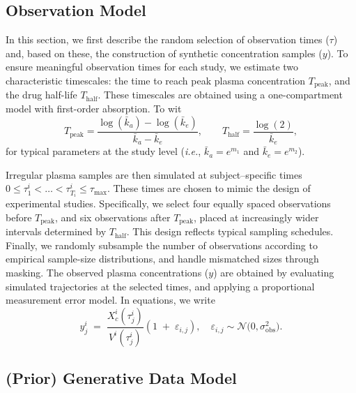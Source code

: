 \subsection{Observation Model}
\label{sec:obs-model}

In this section, we first describe the random selection of observation times ($\tau$) and, based on these, the construction of synthetic concentration samples ($y$).
%
To ensure meaningful observation times for each study, we estimate two characteristic timescales: the time to reach peak plasma concentration $T_\text{peak}$, and the drug half-life $T_\text{half}$. 
%
These timescales are obtained using a one-compartment model with first-order absorption. To wit
%
\begin{equation*}
T_\text{peak} = \frac{\log(\bar k_a) - \log(\bar k_e)}{\bar k_a - \bar k_e},\qquad
T_\text{half} = \frac{\log(2)}{\bar k_e},
\end{equation*}
for typical parameters at the study level (\textit{i.e.}, $\bar k_a = e^{m_1}$ and $\bar k_e = e^{m_2}$).

Irregular plasma samples are then simulated at subject–specific times
\(0\le \tau^i_{1} < \dots < \tau^i_{T_i}\le \tau_\text{max}\). 
%
These times are chosen to mimic the design of experimental studies. 
%
Specifically, we select four equally spaced observations before $T_\text{peak}$, and six observations after $T_\text{peak}$, placed at increasingly wider intervals determined by $T_\text{half}$. 
%
This design reflects typical sampling schedules.
%
Finally, we randomly subsample the number of observations according to empirical sample-size distributions, and handle mismatched sizes through masking. 
%
The observed plasma concentrations ($y$) are obtained by evaluating simulated trajectories at the selected times, and applying a proportional measurement error model. In equations, we write
\begin{equation}
y^i_{j} \;=\; \frac{X^i_{c}(\tau^i_{j})}{V^{i}(\tau^i_{j})}
             (1\;+\; \varepsilon_{i,j}),
\quad
\varepsilon_{i,j}\sim\mathcal{N}\!\bigl(0,\sigma_{\text{obs}}^{2}\bigr).
\label{eq:obs}
\end{equation}

\subsection{(Prior) Generative Data Model}
\label{sec:gen-model}

